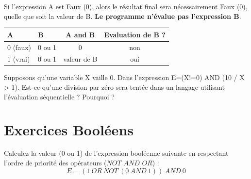 Si l'expression A est Faux (0), alors le résultat final sera nécessairement Faux (0), quelle que soit la valeur de B. \textbf{Le programme n'évalue pas l'expression B}.

\begin{center}
    \begin{tabular}{|l|l|c|c|}
\hline
A        & B      & A and B & Evaluation de B ? \\ \hline
0 (faux) & 0 ou 1 & 0       & non               \\ \hline
1 (vrai) & 0 ou 1 & valeur de B & oui               \\ \hline
\end{tabular}
\end{center}

\begin{Avous}
Supposons qu'une variable X vaille 0. Dans l'expression E=(X!=0) AND (10 / X > 1). Est-ce qu'une division par zéro sera tentée dans un langage utilisant l'évaluation séquentielle ? Pourquoi ?\\
\vspace{3cm}
\end{Avous}

\newpage
\chapter*{Exercices Booléens}

\begin{Exercise}[title = Évaluation d'Expressions]
Calculez la valeur (0 ou 1) de l'expression booléenne suivante en respectant l'ordre de priorité des opérateurs ($NOT$ \> $AND$ \> $OR$) :
 $$E = (1\ OR\ NOT\ (0\ AND\ 1))\ AND\ 0$$
\end{Exercise}




